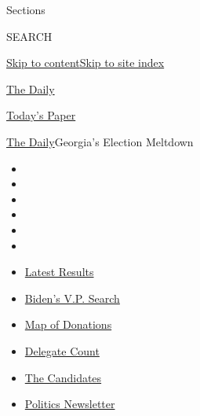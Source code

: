 Sections

SEARCH

\protect\hyperlink{site-content}{Skip to
content}\protect\hyperlink{site-index}{Skip to site index}

\href{https://www.nytimes3xbfgragh.onion/podcasts/the-daily}{The Daily}

\href{https://myaccount.nytimes3xbfgragh.onion/auth/login?response_type=cookie\&client_id=vi}{}

\href{https://www.nytimes3xbfgragh.onion/section/todayspaper}{Today's
Paper}

\href{/podcasts/the-daily}{The Daily}\textbar{}Georgia's Election
Meltdown

\begin{itemize}
\item
\item
\item
\item
\item
\item
\end{itemize}

\begin{itemize}
\item
  \href{https://www.nytimes3xbfgragh.onion/interactive/2020/08/04/us/elections/results-arizona-kansas-michigan-missouri-primaries.html?action=click\&pgtype=Article\&state=default\&region=TOP_BANNER\&context=storylines_menu}{Latest
  Results}
\item
  \href{https://www.nytimes3xbfgragh.onion/article/biden-vice-president-2020.html?action=click\&pgtype=Article\&state=default\&region=TOP_BANNER\&context=storylines_menu}{Biden's
  V.P. Search}
\item
  \href{https://www.nytimes3xbfgragh.onion/interactive/2020/07/24/us/politics/trump-biden-campaign-donors.html?action=click\&pgtype=Article\&state=default\&region=TOP_BANNER\&context=storylines_menu}{Map
  of Donations}
\item
  \href{https://www.nytimes3xbfgragh.onion/interactive/2020/us/elections/delegate-count-primary-results.html?action=click\&pgtype=Article\&state=default\&region=TOP_BANNER\&context=storylines_menu}{Delegate
  Count}
\item
  \href{https://www.nytimes3xbfgragh.onion/interactive/2019/us/politics/2020-presidential-candidates.html?action=click\&pgtype=Article\&state=default\&region=TOP_BANNER\&context=storylines_menu}{The
  Candidates}
\item
  \href{https://www.nytimes3xbfgragh.onion/newsletters/politics?action=click\&pgtype=Article\&state=default\&region=TOP_BANNER\&context=storylines_menu}{Politics
  Newsletter}
\end{itemize}

